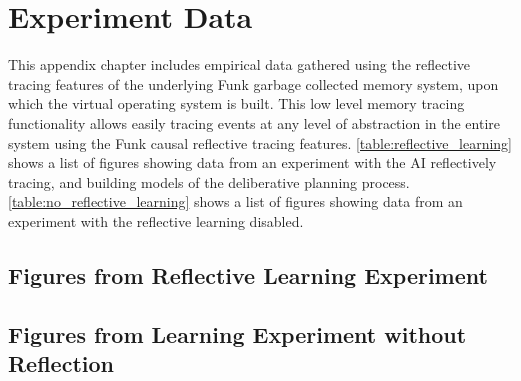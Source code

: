 \chapter{Experiment Data}
\label{chapter:experiment_data}

This appendix chapter includes empirical data gathered using the
reflective tracing features of the underlying Funk garbage collected
memory system, upon which the virtual operating system is built.  This
low level memory tracing functionality allows easily tracing events at
any level of abstraction in the entire system using the Funk causal
reflective tracing features.  \autoref{table:reflective_learning}
shows a list of figures showing data from an experiment with the AI
reflectively tracing, and building models of the deliberative planning
process.  \autoref{table:no_reflective_learning} shows a list of
figures showing data from an experiment with the reflective learning
disabled.




\clearpage
\section{Figures from Reflective Learning Experiment}


\clearpage
\section{Figures from Learning Experiment without Reflection}


